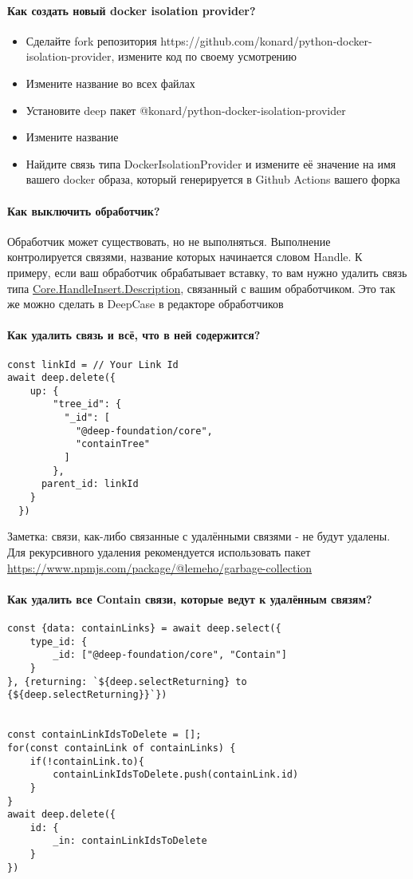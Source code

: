 \paragraph{Как создать новый docker isolation provider?}
\begin{itemize}
      \item Сделайте fork репозитория https://github.com/konard/python-docker-isolation-provider, измените код по своему усмотрению
      \item Измените название во всех файлах
      \item Установите deep пакет @konard/python-docker-isolation-provider
      \item Измените название
      \item Найдите связь типа DockerIsolationProvider и измените её значение на имя вашего docker образа, который генерируется в Github Actions вашего форка
\end{itemize}
\paragraph{Как выключить обработчик?}
Обработчик может существовать, но не выполняться. Выполнение контролируется связями, название которых начинается словом Handle. К примеру, если ваш обработчик обрабатывает вставку, то вам нужно удалить связь типа \hyperlink{HandleInsert}{Core.HandleInsert.Description}, связанный с вашим обработчиком. Это так же можно сделать в DeepCase в редакторе обработчиков
\paragraph{Как удалить связь и всё, что в ней содержится?}
\begin{verbatim}
const linkId = // Your Link Id
await deep.delete({
    up: {
        "tree_id": {
          "_id": [
            "@deep-foundation/core",
            "containTree"
          ]
        },
      parent_id: linkId
    }
  })
\end{verbatim}
Заметка: связи, как-либо связанные с удалёнными связями - не будут удалены. Для рекурсивного удаления рекомендуется использовать пакет \href{@lemeho/garbage-collection}{https://www.npmjs.com/package/@lemeho/garbage-collection}
\paragraph{Как удалить все Contain связи, которые ведут к удалённым связям?}
\begin{verbatim}
const {data: containLinks} = await deep.select({
    type_id: {
        _id: ["@deep-foundation/core", "Contain"]
    }
}, {returning: `${deep.selectReturning} to {${deep.selectReturning}}`})


const containLinkIdsToDelete = [];
for(const containLink of containLinks) {
    if(!containLink.to){
        containLinkIdsToDelete.push(containLink.id)
    }
}
await deep.delete({
    id: {
        _in: containLinkIdsToDelete
    }
})
\end{verbatim}